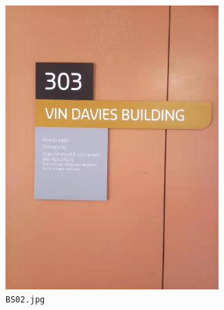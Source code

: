 \documentclass{article}
\begin{document}
\begin{figure}[h]
  \centering
  \begin{subfigure}[h]{0.22\textwidth}
    \centering
    \includegraphics[width=0.9\textwidth]{../train/task1/BS02}
    \caption[BS02]{
      \lstinline{BS02.jpg}
    }
    \label{fig:bs02}
  \end{subfigure}
  \begin{subfigure}[h]{0.22\textwidth}
    \centering

\end{subfigure}
\end{figure}
\end{document}
